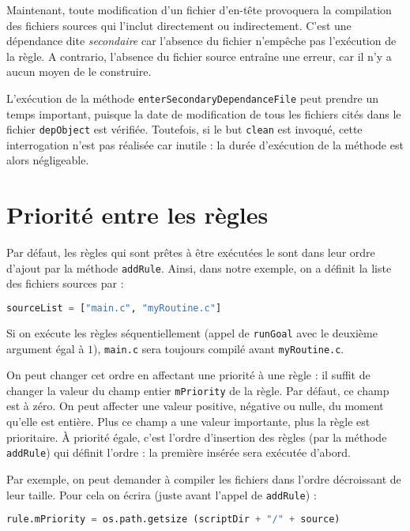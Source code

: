 \documentclass[a4paper,11pt]{extarticle}
\begin{document}
Maintenant, toute modification d'un fichier d'en-tête provoquera la compilation des fichiers sources qui l'inclut directement ou indirectement. C'est une dépendance dite \emph{secondaire} car l'absence du fichier n'empêche pas l'exécution de la règle. A contrario, l'absence du fichier source entraîne une erreur, car il n'y a aucun moyen de le construire.

L'exécution de la méthode \texttt{enterSecondaryDependanceFile} peut prendre un temps important, puisque la date de modification de tous les fichiers cités dans le fichier \texttt{depObject} est vérifiée. Toutefois, si le but \texttt{clean} est invoqué, cette interrogation n'est pas réalisée car inutile : la durée d'exécution de la méthode est alors négligeable.






\section{Priorité entre les règles}

Par défaut, les règles qui sont prêtes à être exécutées le sont dans leur ordre d'ajout par la méthode \texttt{addRule}. Ainsi, dans notre exemple, on a définit la liste des fichiers sources par :
\begin{lstlisting}[language=py]
sourceList = ["main.c", "myRoutine.c"]
\end{lstlisting}
Si on exécute les règles séquentiellement (appel de \texttt{runGoal} avec le deuxième argument égal à $1$), \texttt{main.c} sera toujours compilé avant \texttt{myRoutine.c}.

On peut changer cet ordre en affectant une priorité à une règle : il suffit de changer la valeur du champ entier \texttt{mPriority} de la règle. Par défaut, ce champ est à zéro. On peut affecter une valeur positive, négative ou nulle, du moment qu'elle est entière. Plus ce champ a une valeur importante, plus la règle est prioritaire. À priorité égale, c'est l'ordre d'insertion des règles (par la méthode \texttt{addRule}) qui définit l'ordre : la première insérée sera exécutée d'abord.

Par exemple, on peut demander à compiler les fichiers dans l'ordre décroissant de leur taille. Pour cela on écrira (juste avant l'appel de \texttt{addRule}) :
\begin{lstlisting}[language=py]
  rule.mPriority = os.path.getsize (scriptDir + "/" + source)
\end{lstlisting}
\end{document}
